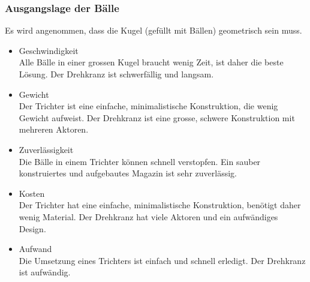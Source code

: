 		\subsubsection{Ausgangslage der Bälle}
			Es wird angenommen, dass die Kugel (gefüllt mit Bällen) geometrisch sein muss.
			\begin{itemize}
				\item Geschwindigkeit\\
				Alle Bälle in einer grossen Kugel braucht wenig Zeit, ist daher die beste Lösung. Der Drehkranz ist schwerfällig und langsam.
				\item Gewicht\\
				Der Trichter ist eine einfache, minimalistische Konstruktion, die wenig Gewicht aufweist. Der Drehkranz ist eine grosse, schwere Konstruktion mit mehreren Aktoren.
				\item Zuverlässigkeit\\
				Die Bälle in einem Trichter können schnell verstopfen. Ein sauber konstruiertes und aufgebautes Magazin ist sehr zuverlässig. 
				\item Kosten\\
				Der Trichter hat eine einfache, minimalistische Konstruktion, benötigt daher wenig Material. Der Drehkranz hat viele Aktoren und ein aufwändiges Design.
				\item Aufwand\\
				Die Umsetzung eines Trichters ist einfach und schnell erledigt. Der Drehkranz ist aufwändig.					
			\end{itemize}
